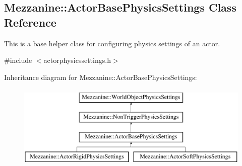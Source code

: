 \hypertarget{classMezzanine_1_1ActorBasePhysicsSettings}{
\subsection{Mezzanine::ActorBasePhysicsSettings Class Reference}
\label{classMezzanine_1_1ActorBasePhysicsSettings}
}


This is a base helper class for configuring physics settings of an actor.  




{\ttfamily \#include $<$actorphysicssettings.h$>$}

Inheritance diagram for Mezzanine::ActorBasePhysicsSettings:\begin{figure}[H]
\begin{center}
\leavevmode
\includegraphics[height=4.000000cm]{classMezzanine_1_1ActorBasePhysicsSettings}
\end{center}
\end{figure}
